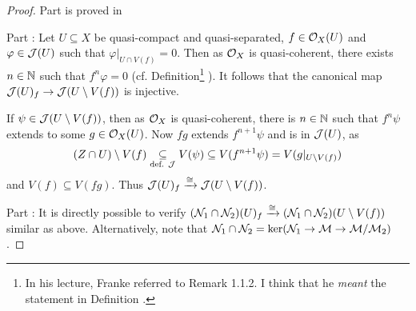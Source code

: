 \documentclass[a4paper,parskip=half,numbers=enddot, DIV=12]{scrreprt}
\begin{document}
\begin{proof}
	Part  is proved in \cite[Proposition~2.1.1]{alggeo1}

	Part : Let $U\subseteq X$ be quasi-compact and quasi-separated, $f\in\mathcal{O}_X(U)$ and $\varphi \in \mathcal{J}(U)$ such
	that $\varphi\vert_{U\cap V(f)}=0$. Then as $\mathcal{O}_X$ is quasi-coherent, there exists $n\in\mathbb{N}$ such that $f^n\varphi = 0$ (cf. Definition\footnote{In his lecture, Franke referred to Remark 1.1.2. I think that he \emph{meant} the statement in Definition
.}
).
	It follows that the canonical map $\mathcal{J}(U)_f\rightarrow \mathcal{J}(U\setminus V(f))$ is injective.

	If $\psi \in \mathcal{J}(U\setminus V(f))$, then as $\mathcal{O}_X$ is quasi-coherent, there is $n\in\mathbb{N}$ such that $f^n\psi$ extends to some
	$g\in \mathcal{O}_X(U)$. Now $fg$ extends $f^{n+1}\psi$ and is in $\mathcal{J}(U)$, as
	\begin{align*}(Z\cap U)\setminus V(f)\underset{\text{def. }\mathcal{J}}\subseteq V(\psi)\subseteq V(f^{n+1} \psi)=V(g\vert_{U\setminus V(f)})\end{align*}
	and $V(f)\subseteq V(fg)$. Thus $\mathcal{J}(U)_f\xrightarrow\cong \mathcal{J}(U\setminus V(f))$.

	Part : It is directly possible to verify $(\mathcal{N}_1\cap \mathcal{N}_2)(U)_f\xrightarrow\cong (\mathcal{N}_1\cap \mathcal{N}_2)(U\setminus V(f))$ similar
	as above. Alternatively, note that $\mathcal{N}_1\cap \mathcal{N}_2 = \ker(\mathcal{N}_1\rightarrow \mathcal{M}\rightarrow\mathcal{M}/\mathcal{M}_2)$.
\end{proof}
\end{document}
